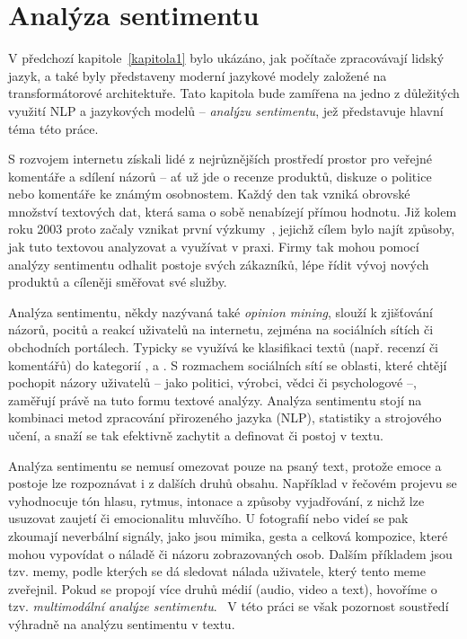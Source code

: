 \chapter{Analýza sentimentu}\label{sentiment}

V předchozí kapitole~\ref{kapitola1} bylo ukázáno, jak počítače zpracovávají lidský jazyk, a také byly představeny moderní jazykové modely založené na transformátorové architektuře. Tato kapitola bude zamířena na jedno z důležitých využití NLP a jazykových modelů -- \emph{analýzu sentimentu}, jež představuje hlavní téma této práce.

S rozvojem internetu získali lidé z nejrůznějších prostředí prostor pro veřejné komentáře a sdílení názorů -- ať už jde o recenze produktů, diskuze o politice nebo komentáře ke známým osobnostem. Každý den tak vzniká obrovské množství textových dat, která sama o sobě nenabízejí přímou hodnotu. Již kolem roku 2003 proto začaly vznikat první výzkumy~\cite{NasukawaSA}, jejichž cílem bylo najít způsoby, jak tuto textovou  analyzovat a využívat v praxi. Firmy tak mohou pomocí analýzy sentimentu odhalit postoje svých zákazníků, lépe řídit vývoj nových produktů a cíleněji směřovat své služby.~\cite{Aqlanstudyofsentiment}

Analýza sentimentu, někdy nazývaná také \emph{opinion mining}, slouží k zjišťování názorů, pocitů a reakcí uživatelů na internetu, zejména na sociálních sítích či obchodních portálech. Typicky se využívá ke klasifikaci textů (např. recenzí či komentářů) do kategorií ,  a . S rozmachem sociálních sítí se oblasti, které chtějí pochopit názory uživatelů -- jako politici, výrobci, vědci či psychologové --, zaměřují právě na tuto formu textové analýzy. Analýza sentimentu stojí na kombinaci metod zpracování přirozeného jazyka (NLP), statistiky a strojového učení, a snaží se tak efektivně zachytit a definovat  či postoj v textu.~\cite{Aqlanstudyofsentiment}

Analýza sentimentu se nemusí omezovat pouze na psaný text, protože emoce a postoje lze rozpoznávat i z dalších druhů obsahu. Například v řečovém projevu se vyhodnocuje tón hlasu, rytmus, intonace a způsoby vyjadřování, z nichž lze usuzovat zaujetí či emocionalitu mluvčího. U fotografií nebo videí se pak zkoumají neverbální signály, jako jsou mimika, gesta a celková kompozice, které mohou vypovídat o náladě či názoru zobrazovaných osob. Dalším příkladem jsou tzv. memy, podle kterých se dá sledovat nálada uživatele, který tento meme zveřejnil. Pokud se propojí více druhů médií (audio, video a text), hovoříme o tzv. \emph{multimodální analýze sentimentu}.~\cite{kumar2023comprehensivereviewsentimentanalysis} V této práci se však pozornost soustředí výhradně na analýzu sentimentu v textu.

